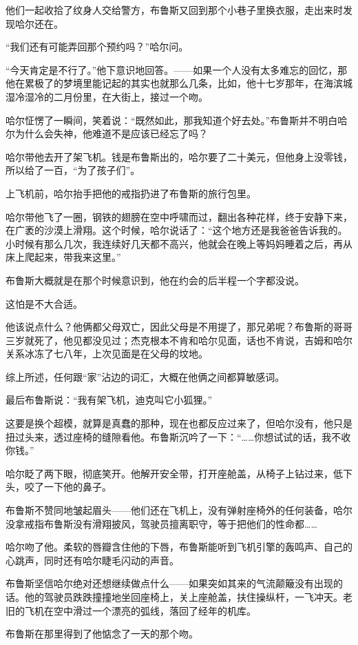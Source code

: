 \documentclass[../main]{subfiles}
\begin{document}
他们一起收拾了纹身人交给警方，布鲁斯又回到那个小巷子里换衣服，走出来时发现哈尔还在。

“我们还有可能弄回那个预约吗？”哈尔问。

“今天肯定是不行了。”他下意识地回答。——如果一个人没有太多难忘的回忆，那他在累极了的梦境里能记起的其实也就那么几条，比如，他十七岁那年，在海滨城湿冷湿冷的二月份里，在大街上，接过一个吻。

哈尔怔愣了一瞬间，笑着说：“既然如此，那我知道个好去处。”布鲁斯并不明白哈尔为什么会失神，他难道不是应该已经忘了吗？

哈尔带他去开了架飞机。钱是布鲁斯出的，哈尔要了二十美元，但他身上没零钱，所以给了一百，“为了孩子们”。

上飞机前，哈尔抬手把他的戒指扔进了布鲁斯的旅行包里。

哈尔带他飞了一圈，钢铁的翅膀在空中呼啸而过，翻出各种花样，终于安静下来，在广袤的沙漠上滑翔。这个时候，哈尔说话了：“这个地方还是我爸爸告诉我的。小时候有那么几次，我连续好几天都不高兴，他就会在晚上等妈妈睡着之后，再从床上爬起来，带我来这里。”

布鲁斯大概就是在那个时候意识到，他在约会的后半程一个字都没说。

这怕是不大合适。

他该说点什么？他俩都父母双亡，因此父母是不用提了，那兄弟呢？布鲁斯的哥哥三岁就死了，他见都没见过；杰克根本不肯和哈尔见面，话也不肯说，吉姆和哈尔关系冰冻了七八年，上次见面是在父母的坟地。

综上所述，任何跟“家”沾边的词汇，大概在他俩之间都算敏感词。

最后布鲁斯说：“我有架飞机，迪克叫它小狐狸。”

这要是换个超模，就算是真蠢的那种，现在也都反应过来了，但哈尔没有，他只是扭过头来，透过座椅的缝隙看他。布鲁斯沉吟了一下：“……你想试试的话，我不收你钱。”

哈尔眨了两下眼，彻底笑开。他解开安全带，打开座舱盖，从椅子上钻过来，低下头，咬了一下他的鼻子。

布鲁斯不赞同地皱起眉头——他们还在飞机上，没有弹射座椅外的任何装备，哈尔没拿戒指布鲁斯没有滑翔披风，驾驶员擅离职守，等于把他们的性命都……

哈尔吻了他。柔软的唇瓣含住他的下唇，布鲁斯能听到飞机引擎的轰鸣声、自己的心跳声，同时还有哈尔睫毛闪动的声音。

布鲁斯坚信哈尔绝对还想继续做点什么——如果突如其来的气流颠簸没有出现的话。他的驾驶员跌跌撞撞地坐回座椅上，关上座舱盖，扶住操纵杆，一飞冲天。老旧的飞机在空中滑过一个漂亮的弧线，落回了经年的机库。

布鲁斯在那里得到了他惦念了一天的那个吻。
\end{document}
